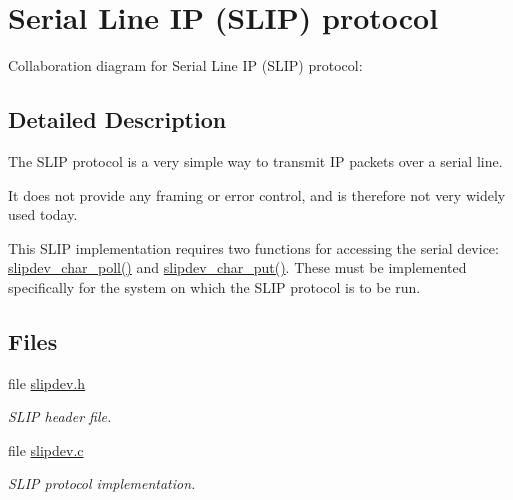 \hypertarget{a00068}{
\section{Serial Line IP (SLIP) protocol}
\label{a00068}
}


Collaboration diagram for Serial Line IP (SLIP) protocol:

\subsection{Detailed Description}
The SLIP protocol is a very simple way to transmit IP packets over a serial line. 

It does not provide any framing or error control, and is therefore not very widely used today.

This SLIP implementation requires two functions for accessing the serial device: \hyperlink{a00068_g4e8cf1d2e3d874b7aa681a272d957ccb}{slipdev\_\-char\_\-poll()} and \hyperlink{a00068_gd78a209e9faa8a97702424b44134ced3}{slipdev\_\-char\_\-put()}. These must be implemented specifically for the system on which the SLIP protocol is to be run. 

\subsection*{Files}
\begin{CompactItemize}
\item 
file \hyperlink{a00052}{slipdev.h}
\begin{CompactList}\small\item\em SLIP header file. \item\end{CompactList}

\item 
file \hyperlink{a00051}{slipdev.c}
\begin{CompactList}\small\item\em SLIP protocol implementation. \item\end{CompactList}

\end{CompactItemize}
